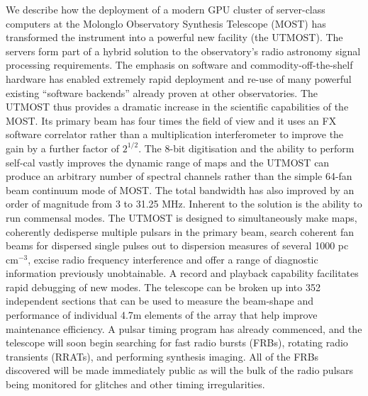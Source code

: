 We describe how the deployment of a modern GPU cluster of server-class computers at the Molonglo Observatory Synthesis Telescope (MOST) has transformed the instrument into a powerful new facility (the UTMOST). The servers form part of a hybrid solution to the observatory's radio astronomy signal processing requirements. The emphasis on software and commodity-off-the-shelf hardware has enabled extremely rapid deployment and re-use of many powerful existing ``software backends'' already proven at other observatories. The UTMOST thus provides a dramatic increase in the scientific capabilities of the MOST. Its primary beam has four times the field of view and it uses an FX software correlator rather than a multiplication interferometer to improve the gain by a further factor of $2^{1/2}$. The 8-bit digitisation and the ability to perform self-cal vastly improves the dynamic range of maps and the UTMOST can produce an arbitrary number of spectral channels rather than the simple 64-fan beam continuum mode of MOST. The total bandwidth has also improved by an order of magnitude from 3 to 31.25 MHz. Inherent to the solution is the ability to run commensal modes. The UTMOST is designed to simultaneously make maps, coherently dedisperse multiple pulsars in the primary beam, search coherent fan beams for dispersed single pulses out to dispersion measures of several 1000 pc cm$^{-3}$, excise radio frequency interference and offer a range of diagnostic information previously unobtainable. A record and playback capability facilitates rapid debugging of new modes. The telescope can be broken up into 352 independent sections that can be used to measure the beam-shape and performance of individual 4.7m elements of the array that help improve maintenance efficiency. A pulsar timing program has already commenced, and the telescope will soon begin searching for fast radio bursts (FRBs), rotating radio transients (RRATs), and performing synthesis imaging. All of the FRBs discovered will be made immediately public as will the bulk of the radio pulsars being monitored for glitches and other timing irregularities. 
